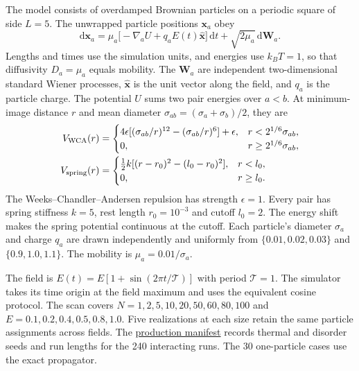 \documentclass[11pt,letterpaper]{article}
\newcommand{\Tr}{\mathcal T}
\newcommand{\ex}{\hat{\mathbf x}}
\newcommand{\dd}{\mathrm d}
\newcommand{\source}[2]{\href{https://github.com/ruichengbao/measuring_irreversibility_counting/blob/e868697ff37a81a72f4ee47956546a0e9cc1604c/#1}{#2}}
\begin{document}
The model consists of overdamped Brownian particles on a periodic square of side $L=5$.
The unwrapped particle positions $\mathbf x_a$ obey
\begin{equation}
 \dd\mathbf x_a=\mu_a\big[-\nabla_a U+q_a E(t)\ex\big]\,\dd t+\sqrt{2\mu_a}\,\dd\mathbf W_a .
 \label{eq:model}
\end{equation}
Lengths and times use the simulation units, and energies use $k_BT=1$, so that diffusivity
$D_a=\mu_a$ equals mobility. The $\mathbf W_a$ are independent two-dimensional standard Wiener
processes, $\ex$ is the unit vector along the field, and $q_a$ is the particle charge.
The potential $U$ sums two pair energies over $a<b$. At minimum-image distance $r$ and mean
diameter $\sigma_{ab}=(\sigma_a+\sigma_b)/2$, they are
\begin{align}
 V_{\rm WCA}(r)&=\begin{cases}
 4\epsilon[(\sigma_{ab}/r)^{12}-(\sigma_{ab}/r)^6]+\epsilon,&r<2^{1/6}\sigma_{ab},\\
 0,&r\geq2^{1/6}\sigma_{ab},
 \end{cases}\\[-1pt]
 V_{\rm spring}(r)&=\begin{cases}
 \tfrac12 k[(r-r_0)^2-(l_0-r_0)^2],&r<l_0,\\
 0,&r\geq l_0 .
 \end{cases}
\end{align}
The Weeks--Chandler--Andersen repulsion has strength $\epsilon=1$. Every pair has spring
stiffness $k=5$, rest length $r_0=10^{-3}$ and cutoff $l_0=2$. The energy shift makes the
spring potential continuous at the cutoff. Each particle's diameter $\sigma_a$ and charge $q_a$
are drawn independently and uniformly from $\{0.01,0.02,0.03\}$ and $\{0.9,1.0,1.1\}$. The mobility is
$\mu_a=0.01/\sigma_a$.

The field is $E(t)=E[1+\sin(2\pi t/\Tr)]$ with period $\Tr=1$. The simulator takes its
time origin at the field maximum and uses the equivalent cosine protocol. The scan covers
$N=1,2,5,10,20,50,60,80,100$ and $E=0.1,0.2,0.4,0.5,0.8,1.0$. Five realizations at each
size retain the same particle assignments across fields. The
\source{numerics/Fig3_corrected/simulation/jobs_manifest_driven_final.json}{production manifest}
records thermal and disorder seeds and run lengths for the 240 interacting runs.
The 30 one-particle cases use the exact propagator.

\newpage
\end{document}
